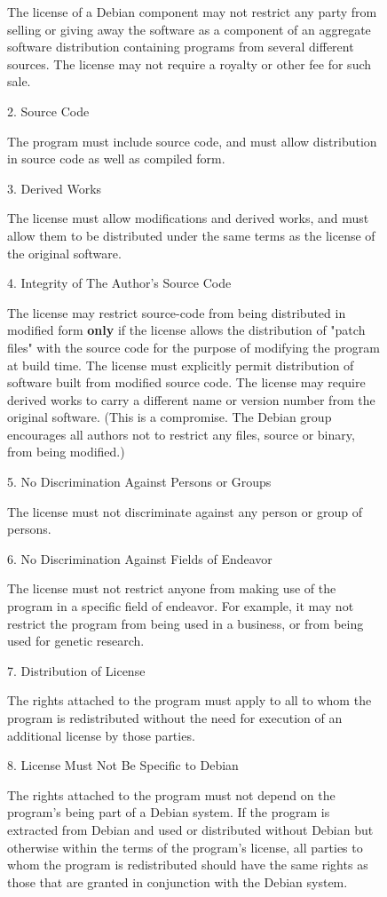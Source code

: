 \documentclass[mingoth,a4paper]{jsarticle}
\begin{document}
{{{{\begin{figure}[h]
\begin{multicols}{2}
{       The license of a Debian component may not restrict any party from
       selling or giving away the software as a component of an aggregate
       software distribution containing programs from several different
       sources. The license may not require a royalty or other fee for
       such sale.

    2. Source Code

       The program must include source code, and must allow distribution
       in source code as well as compiled form.

    3. Derived Works

       The license must allow modifications and derived works, and must
       allow them to be distributed under the same terms as the license
       of the original software.

    4. Integrity of The Author's Source Code

       The license may restrict source-code from being distributed in
       modified form {\bf only} if the license allows the distribution of
       "patch files" with the source code for the purpose of modifying
       the program at build time. The license must explicitly permit
       distribution of software built from modified source code. The
       license may require derived works to carry a different name or
       version number from the original software. (This is a compromise.
       The Debian group encourages all authors not to restrict any files,
       source or binary, from being modified.)

    5. No Discrimination Against Persons or Groups

       The license must not discriminate against any person or group of
       persons.

    6. No Discrimination Against Fields of Endeavor

       The license must not restrict anyone from making use of the
       program in a specific field of endeavor. For example, it may not
       restrict the program from being used in a business, or from being
       used for genetic research.

    7. Distribution of License

       The rights attached to the program must apply to all to whom the
       program is redistributed without the need for execution of an
       additional license by those parties.

    8. License Must Not Be Specific to Debian

       The rights attached to the program must not depend on the
       program's being part of a Debian system. If the program is
       extracted from Debian and used or distributed without Debian but
       otherwise within the terms of the program's license, all parties
       to whom the program is redistributed should have the same rights
       as those that are granted in conjunction with the Debian system.

}
\end{multicols}
\end{figure}}}}}
\end{document}
